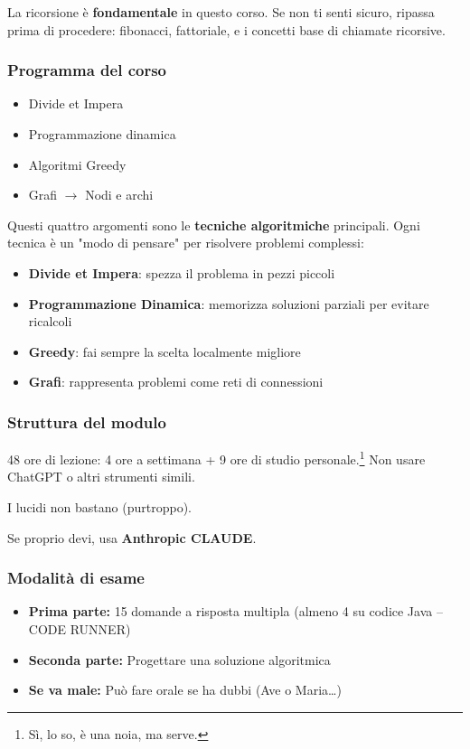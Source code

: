 \documentclass[a4paper, 11pt]{article}
\theoremstyle{definition}
\theoremstyle{remark}
\theoremstyle{remark}
\newenvironment{nota}{%
	\begin{tcolorbox}[
		colback=codebg,
		colframe=primary,
		fonttitle=\bfseries,
		title=Nota,
		left=6pt, right=6pt, top=4pt, bottom=4pt
		]
	}{%
	\end{tcolorbox}
}
\begin{document}
	\begin{nota}
		La ricorsione è \textbf{fondamentale} in questo corso. Se non ti senti sicuro, ripassa prima di procedere: fibonacci, fattoriale, e i concetti base di chiamate ricorsive.
	\end{nota}
	
	\subsubsection{Programma del corso}
	\begin{itemize}
		\item Divide et Impera
		\item Programmazione dinamica
		\item Algoritmi Greedy
		\item Grafi $\to$ Nodi e archi
	\end{itemize}
	
	\begin{softnote}
		Questi quattro argomenti sono le \textbf{tecniche algoritmiche} principali. Ogni tecnica è un "modo di pensare" per risolvere problemi complessi:
		\begin{itemize}
			\item \textbf{Divide et Impera}: spezza il problema in pezzi piccoli
			\item \textbf{Programmazione Dinamica}: memorizza soluzioni parziali per evitare ricalcoli
			\item \textbf{Greedy}: fai sempre la scelta localmente migliore
			\item \textbf{Grafi}: rappresenta problemi come reti di connessioni
		\end{itemize}
	\end{softnote}
	
	\subsubsection{Struttura del modulo}
	48 ore di lezione: 4 ore a settimana + 9 ore di studio personale.\footnote{Sì, lo so, è una noia, ma serve.}
	Non usare ChatGPT o altri strumenti simili.
	
	I lucidi non bastano (purtroppo).
	
	Se proprio devi, usa \textbf{Anthropic CLAUDE}.
	
	\subsubsection{Modalità di esame}
	\begin{itemize}
		\item \textbf{Prima parte:} 15 domande a risposta multipla
		(almeno 4 su codice Java -- CODE RUNNER)
		\item \textbf{Seconda parte:} Progettare una soluzione algoritmica
		\item \textbf{Se va male:} Può fare orale se ha dubbi (Ave o Maria\dots)
	\end{itemize}
	
\end{document}
